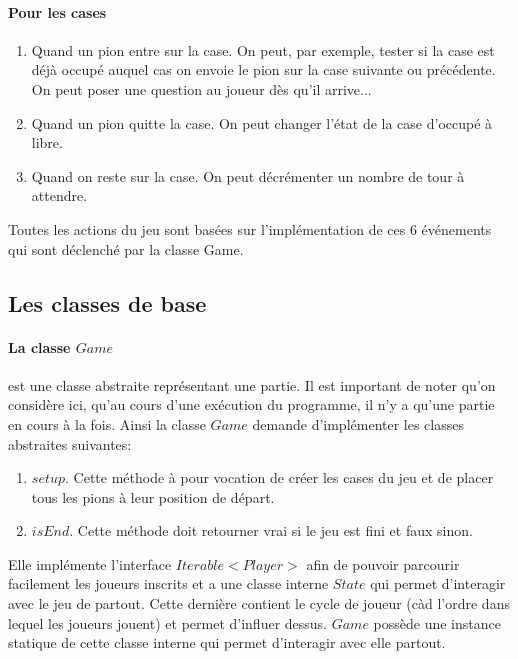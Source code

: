 \documentclass{article}
\begin{document}
\paragraph{Pour les cases}
\begin{enumerate}
\item Quand un pion entre sur la case. On peut, par exemple, tester si la case est déjà occupé auquel cas on envoie le pion sur la case suivante ou précédente. On peut poser une question au joueur dès qu'il arrive...
\item Quand un pion quitte la case. On peut changer l'état de la case d'occupé à libre.
\item Quand on reste sur la case. On peut décrémenter un nombre de tour à attendre.
\end{enumerate}

Toutes les actions du jeu sont basées sur l'implémentation de ces 6 événements qui sont déclenché par la classe Game.

\subsection{Les classes de base}

\paragraph{La classe $Game$} est une classe abstraite représentant une partie. Il est important de noter qu'on considère ici, qu'au cours d'une exécution du programme, il n'y a qu'une partie en cours à la fois. Ainsi la classe $Game$ demande d'implémenter les classes abstraites suivantes:

\begin{enumerate}
\item $setup$. Cette méthode à pour vocation de créer les cases du jeu et de placer tous les pions à leur position de départ.
\item $isEnd$. Cette méthode doit retourner vrai si le jeu est fini et faux sinon.
\end{enumerate}

Elle implémente l'interface $Iterable<Player>$ afin de pouvoir parcourir facilement les joueurs inscrits et a une classe interne $State$ qui permet d'interagir avec le jeu de partout. Cette dernière contient le cycle de joueur (càd l'ordre dans lequel les joueurs jouent) et permet d'influer dessus. $Game$ possède une instance statique de cette classe interne qui permet d'interagir avec elle partout.
\end{document}
